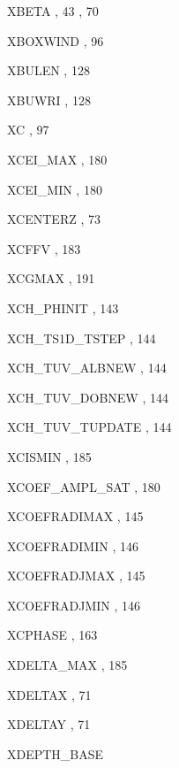\begin{theindex}
  \item XBETA
    \subitem {},  43
    \subitem {},  70
  \item XBOXWIND
    \subitem {},  96
  \item XBULEN
    \subitem {},  128
  \item XBUWRI
    \subitem {},  128
  \item XC
    \subitem {},  97
  \item XCEI\_MAX
    \subitem {},  180
  \item XCEI\_MIN
    \subitem {},  180
  \item XCENTERZ
    \subitem {},  73
  \item XCFFV
    \subitem {},  183
  \item XCGMAX
    \subitem {},  191
  \item XCH\_PHINIT
    \subitem {},  143
  \item XCH\_TS1D\_TSTEP
    \subitem {},  144
  \item XCH\_TUV\_ALBNEW
    \subitem {},  144
  \item XCH\_TUV\_DOBNEW
    \subitem {},  144
  \item XCH\_TUV\_TUPDATE
    \subitem {},  144
  \item XCISMIN
    \subitem {},  185
  \item XCOEF\_AMPL\_SAT
    \subitem {},  180
  \item XCOEFRADIMAX
    \subitem {},  145
  \item XCOEFRADIMIN
    \subitem {},  146
  \item XCOEFRADJMAX
    \subitem {},  145
  \item XCOEFRADJMIN
    \subitem {},  146
  \item XCPHASE
    \subitem {},  163
  \item XDELTA\_MAX
    \subitem {},  185
  \item XDELTAX
    \subitem {},  71
  \item XDELTAY
    \subitem {},  71
  \item XDEPTH\_BASE 

\end{theindex}
